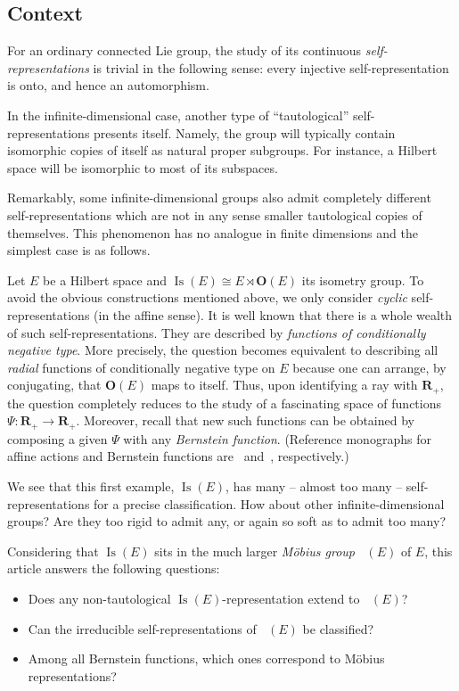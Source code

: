 \documentclass[11pt]{article}
\theoremstyle{definition}
\numberwithin{equation}{section}
\numberwithin{figure}{section}
\numberwithin{table}{section}
\newcommand{\RR}{\mathbf{R}}
\newcommand{\OO}{{\mathbf O}}
\DeclareMathOperator{\Isom}{Is}
\DeclareMathOperator{\Mob}{M\ddot{o}b}
\begin{document}
\subsection{Context}

For an ordinary connected Lie group, the study of its continuous \emph{self-representations} is trivial in the following sense: every injective self-representation is onto, and hence an automorphism.

In the infinite-dimensional case, another type of ``tautological'' self-representations presents itself. Namely, the group will typically contain isomorphic copies of itself as natural proper subgroups. For instance, a Hilbert space will be isomorphic to most of its subspaces.

Remarkably, some infinite-dimensional groups also admit completely different self-representations which are not in any sense smaller tautological copies of themselves. This phenomenon has no analogue in finite dimensions and the simplest case is as follows.

Let $E$ be a Hilbert space and $\Isom(E)\cong E \rtimes \OO(E)$ its isometry group. To avoid the obvious constructions mentioned above, we only consider \emph{cyclic} self-representations (in the affine sense). It is well known that there is a whole wealth of such self-representations. They are described by \emph{functions of conditionally negative type}. More precisely, the question becomes equivalent to describing all \emph{radial} functions of conditionally negative type on $E$ because one can arrange, by conjugating, that $\OO(E)$ maps to itself. Thus, upon identifying a ray with $\RR_+$, the question completely reduces to the study of a fascinating space of functions $\Psi\colon \RR_+\to \RR_+$. Moreover, recall that new such functions can be obtained by composing a given $\Psi$ with any \emph{Bernstein function}. (Reference monographs for affine actions and Bernstein functions are~\cite{Bekka-Harpe-Valette} and~\cite{Schilling-Song-Vondracek_2}, respectively.)

We see that this first example, $\Isom(E)$, has many -- almost too many -- self-represen\-tations for a precise classification. How about other infinite-dimensional groups? Are they too rigid to admit any, or again so soft as to admit too many?


Considering that $\Isom(E)$ sits in the much larger \emph{M\"obius group} $\Mob(E)$ of $E$, this article answers the following questions:

\begin{itemize}
\item Does any non-tautological $\Isom(E)$-representation extend to $\Mob(E)$?
\item Can the irreducible self-representations of $\Mob(E)$ be classified?
\item Among all Bernstein functions, which ones correspond to M\"obius representations?
\end{itemize}
\end{document}
